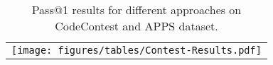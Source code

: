 \begin{table}[h]
    \centering
    \begin{tabular}{c}
    \hspace*{-0.3cm}
    \texttt{[image: figures/tables/Contest-Results.pdf]}
    \end{tabular}
    \caption{Pass@1 results for different approaches on CodeContest and APPS dataset. }
    \label{tab:cc-dataset-results}
    \vspace{-4mm}
\end{table}
